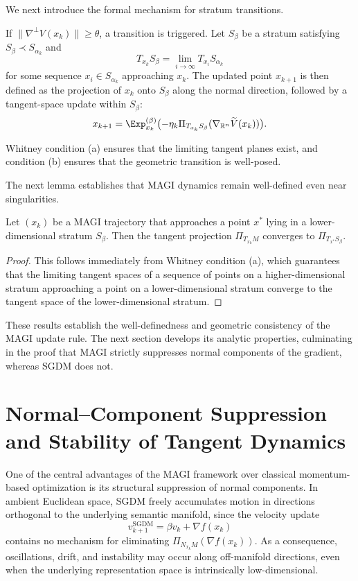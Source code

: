 \documentclass[12pt]{article}
\begin{document}
We next introduce the formal mechanism for stratum transitions.

\begin{definition}
If $\|\nabla^\perp V(x_k)\| \geq \theta$, a transition is triggered. Let $S_\beta$ be a stratum satisfying $S_\beta \prec S_{\alpha_k}$ and
\[
T_{x_k} S_\beta = \lim_{i \to \infty} T_{x_i} S_{\alpha_k}
\]
for some sequence $x_i \in S_{\alpha_k}$ approaching $x_k$. The updated point $x_{k+1}$ is then defined as the projection of $x_k$ onto $S_\beta$ along the normal direction, followed by a tangent-space update within $S_\beta$:
\[
x_{k+1} = \Exp_{x_k}^{(\beta)} \bigl( -\eta_k \Pi_{T_{x_k} S_\beta}(\nabla_{\mathbb{R}^n} \widetilde{V}(x_k)) \bigr).
\]
\end{definition}

Whitney condition (a) ensures that the limiting tangent planes exist, and condition (b) ensures that the geometric transition is well-posed.

The next lemma establishes that MAGI dynamics remain well-defined even near singularities.

\begin{lemma}
Let $(x_k)$ be a MAGI trajectory that approaches a point $x^\ast$ lying in a lower-dimensional stratum $S_\beta$. Then the tangent projection $\Pi_{T_{x_k} M}$ converges to $\Pi_{T_{x^\ast} S_\beta}$.
\end{lemma}

\begin{proof}
This follows immediately from Whitney condition (a), which guarantees that the limiting tangent spaces of a sequence of points on a higher-dimensional stratum approaching a point on a lower-dimensional stratum converge to the tangent space of the lower-dimensional stratum.
\end{proof}

These results establish the well-definedness and geometric consistency of the MAGI update rule. The next section develops its analytic properties, culminating in the proof that MAGI strictly suppresses normal components of the gradient, whereas SGDM does not.

\section{Normal--Component Suppression and Stability of Tangent Dynamics}

One of the central advantages of the MAGI framework over classical momentum-based optimization is its structural suppression of normal components. In ambient Euclidean space, SGDM freely accumulates motion in directions orthogonal to the underlying semantic manifold, since the velocity update
\[
v_{k+1}^{\mathrm{SGDM}} = \beta v_k + \nabla f(x_k)
\]
contains no mechanism for eliminating $\Pi_{N_{x_k}M}(\nabla f(x_k))$. As a consequence, oscillations, drift, and instability may occur along off-manifold directions, even when the underlying representation space is intrinsically low-dimensional.
\end{document}
